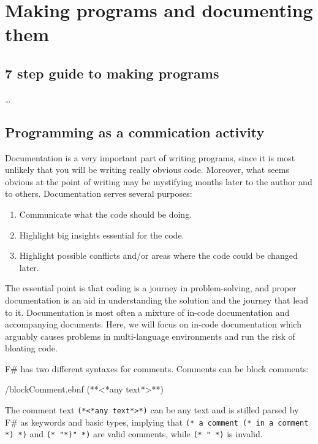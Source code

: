 \documentclass[springer.tex]{subfiles}
\begin{document}
\chapter{Making programs and documenting them}


\section{7 step guide to making programs}
\dots

\section{Programming as a commication activity}
\label{chap:documentation}
Documentation is a very important part of writing programs, since it is most unlikely that you will be writing really obvious code. Moreover, what seems obvious at the point of writing may be mystifying months later to the author and to others. Documentation serves several purposes:
\begin{enumerate}
\item Communicate what the code should be doing.
\item Highlight big insights essential for the code.
\item Highlight possible conflicts and/or areas where the code could be changed later.
\end{enumerate}
The essential point is that coding is a journey in problem-solving, and proper documentation is an aid in understanding the solution and the journey that lead to it. Documentation is most often a mixture of in-code documentation and accompanying documents. Here, we will focus on in-code documentation which arguably causes problems in multi-language environments and run the risk of bloating code.

F\# has two different syntaxes for comments. Comments can be block
comments: 
%
\begin{verbatimwrite}{\ebnf/blockComment.ebnf}
(**<*any text*>**)
\end{verbatimwrite}
%
The comment text \lstinline[language=syntax]{(*<*any text*>*)} can be any text and is stilled parsed by F\# as keywords and basic types, implying that \lstinline!(* a comment (* in a comment *) *)! and \lstinline[morecomment={[l][\color{commentsColor}]{(*}}]!(* "*)" *)! are valid comments, while \lstinline!(* " *)! is invalid.
\end{document}
